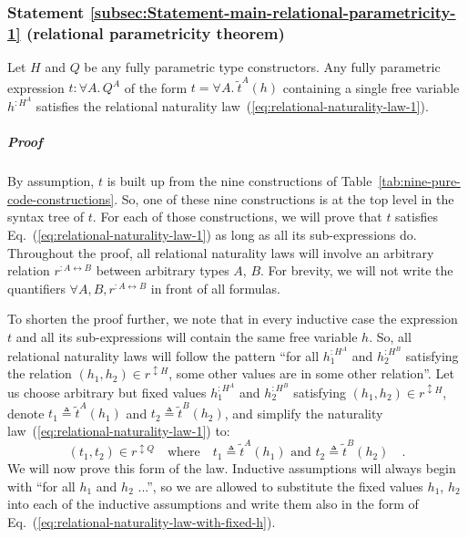 \subsubsection{Statement \label{subsec:Statement-main-relational-parametricity-1}\ref{subsec:Statement-main-relational-parametricity-1}
(relational parametricity theorem)}

Let $H$ and $Q$ be any fully parametric type constructors. Any fully
parametric expression $t:\forall A.\,Q^{A}$ of the form $t=\forall A.\:\tilde{t}^{A}(h)$
containing a single free variable $h^{:H^{A}}$ satisfies the relational
naturality law~(\ref{eq:relational-naturality-law-1}).

\subparagraph{Proof }

By assumption, $t$ is built up from the nine constructions of Table~\ref{tab:nine-pure-code-constructions}.
So, one of these nine constructions is at the top level in the syntax
tree of $t$. For each of those constructions, we will prove that
$t$ satisfies Eq.~(\ref{eq:relational-naturality-law-1}) as long
as all its sub-expressions do. Throughout the proof, all relational
naturality laws will involve an arbitrary relation $r^{:A\leftrightarrow B}$
between arbitrary types $A$, $B$. For brevity, we will not write
the quantifiers $\forall A,B,r^{:A\leftrightarrow B}$ in front of
all formulas.

To shorten the proof further, we note that in every inductive case
the expression $t$ and all its sub-expressions will contain the same
free variable $h$. So, all relational naturality laws will follow
the pattern \textsf{``}for all $h_{1}^{:H^{A}}$ and $h_{2}^{:H^{B}}$ satisfying
the relation $(h_{1},h_{2})\in r^{\updownarrow H}$, some other values
are in some other relation\textsf{''}. Let us choose arbitrary but fixed values
$h_{1}^{:H^{A}}$ and $h_{2}^{:H^{B}}$ satisfying $(h_{1},h_{2})\in r^{\updownarrow H}$,
denote $t_{1}\triangleq\tilde{t}^{A}(h_{1})$ and $t_{2}\triangleq\tilde{t}^{B}(h_{2})$,
and simplify the naturality law~(\ref{eq:relational-naturality-law-1})
to:
\begin{equation}
(t_{1},t_{2})\in r^{\updownarrow Q}\quad\text{where}\quad t_{1}\triangleq\tilde{t}^{A}(h_{1})\text{ and }t_{2}\triangleq\tilde{t}^{B}(h_{2})\quad.\label{eq:relational-naturality-law-with-fixed-h}
\end{equation}
We will now prove this form of the law. Inductive assumptions will
always begin with \textsf{``}for all $h_{1}$ and $h_{2}$ ...\textsf{''}, so we are
allowed to substitute the fixed values $h_{1}$, $h_{2}$ into each
of the inductive assumptions and write them also in the form of Eq.~(\ref{eq:relational-naturality-law-with-fixed-h}).

